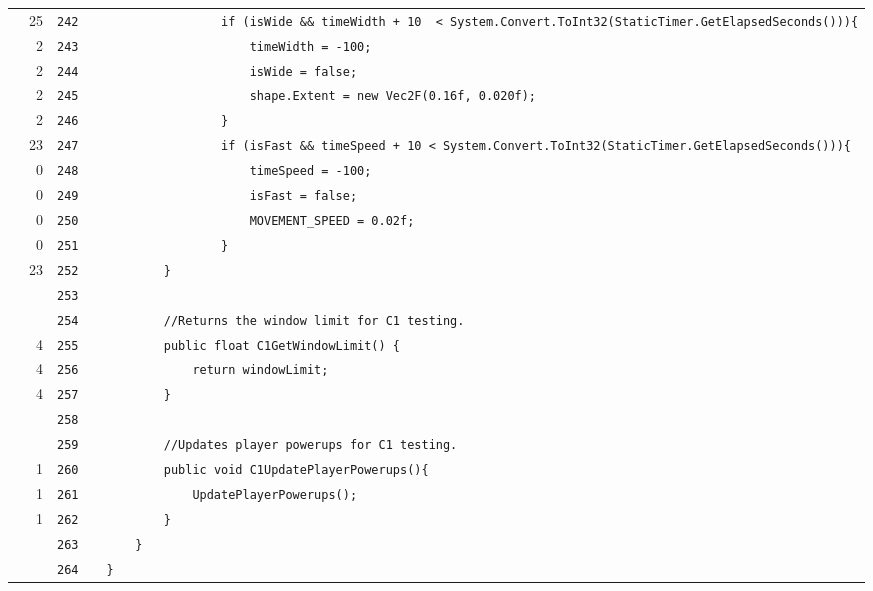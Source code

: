 \documentclass[a4paper,landscape,10pt]{article}
\begin{document}
\begin{longtable}[l]{lrrll}
\cellcolor{green} & 25 & \verb~242~ & & \verb~                if (isWide && timeWidth + 10  < System.Convert.ToInt32(StaticTimer.GetElapsedSeconds())){~\\
\cellcolor{green} & 2 & \verb~243~ & & \verb~                    timeWidth = -100;~\\
\cellcolor{green} & 2 & \verb~244~ & & \verb~                    isWide = false;~\\
\cellcolor{green} & 2 & \verb~245~ & & \verb~                    shape.Extent = new Vec2F(0.16f, 0.020f);~\\
\cellcolor{green} & 2 & \verb~246~ & & \verb~                }~\\
\cellcolor{orange} & 23 & \verb~247~ & & \verb~                if (isFast && timeSpeed + 10 < System.Convert.ToInt32(StaticTimer.GetElapsedSeconds())){~\\
\cellcolor{red} & 0 & \verb~248~ & & \verb~                    timeSpeed = -100;~\\
\cellcolor{red} & 0 & \verb~249~ & & \verb~                    isFast = false;~\\
\cellcolor{red} & 0 & \verb~250~ & & \verb~                    MOVEMENT_SPEED = 0.02f;~\\
\cellcolor{red} & 0 & \verb~251~ & & \verb~                }~\\
\cellcolor{green} & 23 & \verb~252~ & & \verb~        }~\\
\cellcolor{gray} &  & \verb~253~ & & \verb~~\\
\cellcolor{gray} &  & \verb~254~ & & \verb~        //Returns the window limit for C1 testing.~\\
\cellcolor{green} & 4 & \verb~255~ & & \verb~        public float C1GetWindowLimit() {~\\
\cellcolor{green} & 4 & \verb~256~ & & \verb~            return windowLimit;~\\
\cellcolor{green} & 4 & \verb~257~ & & \verb~        }~\\
\cellcolor{gray} &  & \verb~258~ & & \verb~~\\
\cellcolor{gray} &  & \verb~259~ & & \verb~        //Updates player powerups for C1 testing.~\\
\cellcolor{green} & 1 & \verb~260~ & & \verb~        public void C1UpdatePlayerPowerups(){~\\
\cellcolor{green} & 1 & \verb~261~ & & \verb~            UpdatePlayerPowerups();~\\
\cellcolor{green} & 1 & \verb~262~ & & \verb~        }~\\
\cellcolor{gray} &  & \verb~263~ & & \verb~    }~\\
\cellcolor{gray} &  & \verb~264~ & & \verb~}~\\
\end{longtable}
\newpage
\end{document}
